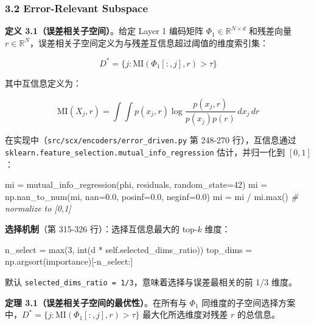 \documentclass[
  12pt,
]{ctexart}
\newenvironment{Shaded}{}{}
\newcommand{\BuiltInTok}[1]{\textcolor[rgb]{0.00,0.50,0.00}{#1}}
\newcommand{\CommentTok}[1]{\textcolor[rgb]{0.38,0.63,0.69}{\textit{#1}}}
\newcommand{\DecValTok}[1]{\textcolor[rgb]{0.25,0.63,0.44}{#1}}
\newcommand{\FloatTok}[1]{\textcolor[rgb]{0.25,0.63,0.44}{#1}}
\newcommand{\NormalTok}[1]{#1}
\newcommand{\OperatorTok}[1]{\textcolor[rgb]{0.40,0.40,0.40}{#1}}
\newcommand{\VariableTok}[1]{\textcolor[rgb]{0.10,0.09,0.49}{#1}}
\begin{document}
\subsubsection{3.2 Error-Relevant
Subspace}\label{error-relevant-subspace}

\textbf{定义 3.1（误差相关子空间）}。给定 Layer 1 编码矩阵
\(\Phi_1 \in \mathbb{R}^{N \times d}\) 和残差向量
\(r \in \mathbb{R}^N\)，误差相关子空间定义为与残差互信息超过阈值的维度索引集：

\[D^* = \{j: \text{MI}(\Phi_1[:, j], r) > \tau\}\]

其中互信息定义为：

\[\text{MI}(X_j, r) = \int \int p(x_j, r) \log \frac{p(x_j, r)}{p(x_j)p(r)} \, dx_j \, dr\]

在实现中（\texttt{src/scx/encoders/error\_driven.py} 第 248-270
行），互信息通过
\texttt{sklearn.feature\_selection.mutual\_info\_regression}
估计，并归一化到 \([0,1]\)：

\begin{Shaded}
\begin{Highlighting}[]
\NormalTok{mi }\OperatorTok{=}\NormalTok{ mutual\_info\_regression(phi, residuals, random\_state}\OperatorTok{=}\DecValTok{42}\NormalTok{)}
\NormalTok{mi }\OperatorTok{=}\NormalTok{ np.nan\_to\_num(mi, nan}\OperatorTok{=}\FloatTok{0.0}\NormalTok{, posinf}\OperatorTok{=}\FloatTok{0.0}\NormalTok{, neginf}\OperatorTok{=}\FloatTok{0.0}\NormalTok{)}
\NormalTok{mi }\OperatorTok{=}\NormalTok{ mi }\OperatorTok{/}\NormalTok{ mi.}\BuiltInTok{max}\NormalTok{()  }\CommentTok{\# normalize to [0,1]}
\end{Highlighting}
\end{Shaded}

\textbf{选择机制}（第 315-326 行）：选择互信息最大的 top-\(k\) 维度：

\begin{Shaded}
\begin{Highlighting}[]
\NormalTok{n\_select }\OperatorTok{=} \BuiltInTok{max}\NormalTok{(}\DecValTok{3}\NormalTok{, }\BuiltInTok{int}\NormalTok{(d }\OperatorTok{*} \VariableTok{self}\NormalTok{.selected\_dims\_ratio))}
\NormalTok{top\_dims }\OperatorTok{=}\NormalTok{ np.argsort(importance)[}\OperatorTok{{-}}\NormalTok{n\_select:]}
\end{Highlighting}
\end{Shaded}

默认 \texttt{selected\_dims\_ratio\ =\ 1/3}，意味着选择与误差最相关的前
1/3 维度。

\textbf{定理 3.1（误差相关子空间的最优性）}。在所有与 \(\Phi_1\)
同维度的子空间选择方案中，\(D^* = \{j: \text{MI}(\Phi_1[:, j], r) > \tau\}\)
最大化所选维度对残差 \(r\) 的总信息。
\end{document}
